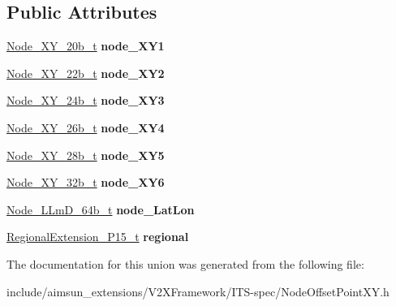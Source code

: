 \subsection*{Public Attributes}
\begin{DoxyCompactItemize}
\item 
\hyperlink{structNode__XY__20b}{Node\+\_\+\+X\+Y\+\_\+20b\+\_\+t} {\bfseries node\+\_\+\+X\+Y1}\hypertarget{unionNodeOffsetPointXY_1_1NodeOffsetPointXY__u_a7ebf4cc19e321ef662ba022c6329073f}{}\label{unionNodeOffsetPointXY_1_1NodeOffsetPointXY__u_a7ebf4cc19e321ef662ba022c6329073f}

\item 
\hyperlink{structNode__XY__22b}{Node\+\_\+\+X\+Y\+\_\+22b\+\_\+t} {\bfseries node\+\_\+\+X\+Y2}\hypertarget{unionNodeOffsetPointXY_1_1NodeOffsetPointXY__u_ab6cb721beb641d2d412dffbb31eb6f04}{}\label{unionNodeOffsetPointXY_1_1NodeOffsetPointXY__u_ab6cb721beb641d2d412dffbb31eb6f04}

\item 
\hyperlink{structNode__XY__24b}{Node\+\_\+\+X\+Y\+\_\+24b\+\_\+t} {\bfseries node\+\_\+\+X\+Y3}\hypertarget{unionNodeOffsetPointXY_1_1NodeOffsetPointXY__u_a498c10aad142a01a392db7e4dc3a5990}{}\label{unionNodeOffsetPointXY_1_1NodeOffsetPointXY__u_a498c10aad142a01a392db7e4dc3a5990}

\item 
\hyperlink{structNode__XY__26b}{Node\+\_\+\+X\+Y\+\_\+26b\+\_\+t} {\bfseries node\+\_\+\+X\+Y4}\hypertarget{unionNodeOffsetPointXY_1_1NodeOffsetPointXY__u_afe5e0499535c54d41c64bf43c8373804}{}\label{unionNodeOffsetPointXY_1_1NodeOffsetPointXY__u_afe5e0499535c54d41c64bf43c8373804}

\item 
\hyperlink{structNode__XY__28b}{Node\+\_\+\+X\+Y\+\_\+28b\+\_\+t} {\bfseries node\+\_\+\+X\+Y5}\hypertarget{unionNodeOffsetPointXY_1_1NodeOffsetPointXY__u_a2b185916fbca016cbda6eda645c6cd3c}{}\label{unionNodeOffsetPointXY_1_1NodeOffsetPointXY__u_a2b185916fbca016cbda6eda645c6cd3c}

\item 
\hyperlink{structNode__XY__32b}{Node\+\_\+\+X\+Y\+\_\+32b\+\_\+t} {\bfseries node\+\_\+\+X\+Y6}\hypertarget{unionNodeOffsetPointXY_1_1NodeOffsetPointXY__u_a9a32883483132cddf3cffbe70275b86c}{}\label{unionNodeOffsetPointXY_1_1NodeOffsetPointXY__u_a9a32883483132cddf3cffbe70275b86c}

\item 
\hyperlink{structNode__LLmD__64b}{Node\+\_\+\+L\+Lm\+D\+\_\+64b\+\_\+t} {\bfseries node\+\_\+\+Lat\+Lon}\hypertarget{unionNodeOffsetPointXY_1_1NodeOffsetPointXY__u_ad6d5447c10effc0cddd10b5eefb3c7bf}{}\label{unionNodeOffsetPointXY_1_1NodeOffsetPointXY__u_ad6d5447c10effc0cddd10b5eefb3c7bf}

\item 
\hyperlink{structRegionalExtension__272P15}{Regional\+Extension\+\_\+P15\+\_\+t} {\bfseries regional}\hypertarget{unionNodeOffsetPointXY_1_1NodeOffsetPointXY__u_a41f557cd84c8e3bff4fa4b5856dda36f}{}\label{unionNodeOffsetPointXY_1_1NodeOffsetPointXY__u_a41f557cd84c8e3bff4fa4b5856dda36f}

\end{DoxyCompactItemize}


The documentation for this union was generated from the following file\+:\begin{DoxyCompactItemize}
\item 
include/aimsun\+\_\+extensions/\+V2\+X\+Framework/\+I\+T\+S-\/spec/Node\+Offset\+Point\+X\+Y.\+h\end{DoxyCompactItemize}
